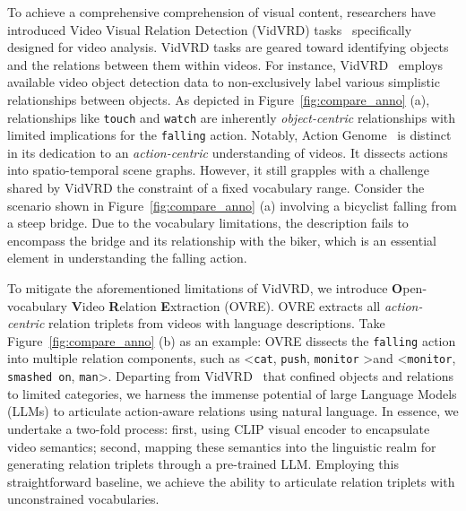 \documentclass[letterpaper]{article}
\begin{document}
To achieve a comprehensive comprehension of visual content, researchers have introduced Video Visual Relation Detection (VidVRD) tasks~\cite{Shang2017VideoVR,shang2019annotating} specifically designed for video analysis. VidVRD tasks are geared toward identifying objects and the relations between them within videos.
For instance, VidVRD~\cite{Shang2017VideoVR} employs available video object detection data to non-exclusively label various simplistic relationships between objects. As depicted in Figure~\ref{fig:compare_anno} (a), relationships like \texttt{touch} and \texttt{watch} are inherently \emph{object-centric} relationships with limited implications for the \texttt{falling} action.
Notably, Action Genome~\cite{genome} is distinct in its dedication to an \emph{action-centric} understanding of videos. It dissects actions into spatio-temporal scene graphs. However, it still grapples with a challenge shared by VidVRD  the constraint of a fixed vocabulary range. Consider the scenario shown in Figure~\ref{fig:compare_anno} (a) involving a bicyclist falling from a steep bridge. Due to the vocabulary limitations, the description fails to encompass the bridge and its relationship with the biker, which is an essential element in understanding the falling action.




To mitigate the aforementioned limitations of VidVRD, we introduce \textbf{O}pen-vocabulary \textbf{V}ideo \textbf{R}elation \textbf{E}xtraction (OVRE). OVRE extracts all \emph{action-centric} relation triplets from videos with language descriptions. Take Figure~\ref{fig:compare_anno} (b) as an example: OVRE dissects the \texttt{falling} action into multiple relation components, such as  \textless \texttt{cat}, \texttt{push}, \texttt{monitor} \textgreater and  \textless \texttt{monitor}, \texttt{smashed on}, \texttt{man}\textgreater.
Departing from VidVRD~\cite{Shang2017VideoVR} that confined objects and relations to limited categories, we harness the immense potential of large Language Models (LLMs) to articulate action-aware relations using natural language. In essence, we undertake a two-fold process: first, using CLIP visual encoder to encapsulate video semantics; second, mapping these semantics into the linguistic realm for generating relation triplets through a pre-trained LLM. Employing this straightforward baseline, we achieve the ability to articulate relation triplets with unconstrained vocabularies.
\end{document}
